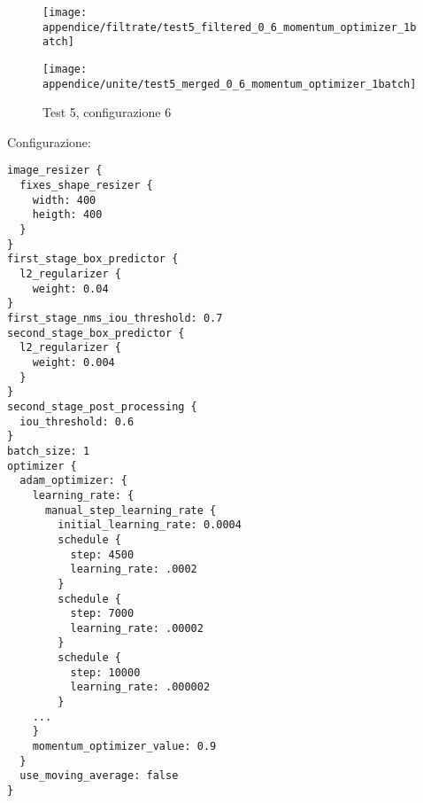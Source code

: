 \newpage
\begin{figure}[H]  
    \begin{minipage}{.5\columnwidth}  
        \centering  
        \texttt{[image: appendice/filtrate/test5\_filtered\_0\_6\_momentum\_optimizer\_1batch]}  
    \end{minipage}%
    \begin{minipage}{0.5\columnwidth}  
        \centering  
        \texttt{[image: appendice/unite/test5\_merged\_0\_6\_momentum\_optimizer\_1batch]}  
    \end{minipage}  
    \caption{Test 5, configurazione 6}
\end{figure}%
Configurazione:
\begin{multicols}{2}
    \begin{lstlisting}
image_resizer {
  fixes_shape_resizer {
    width: 400
    heigth: 400
  }
}
first_stage_box_predictor {
  l2_regularizer {
    weight: 0.04
}
first_stage_nms_iou_threshold: 0.7
second_stage_box_predictor {
  l2_regularizer {
    weight: 0.004
  }
}
second_stage_post_processing {
  iou_threshold: 0.6
}
batch_size: 1
optimizer {
  adam_optimizer: {
    learning_rate: {
      manual_step_learning_rate {
        initial_learning_rate: 0.0004
        schedule {
          step: 4500
          learning_rate: .0002
        }
        schedule {
          step: 7000
          learning_rate: .00002
        }
        schedule {
          step: 10000
          learning_rate: .000002
        }
    ...
    }
    momentum_optimizer_value: 0.9
  }
  use_moving_average: false
}
    \end{lstlisting}
\end{multicols}

